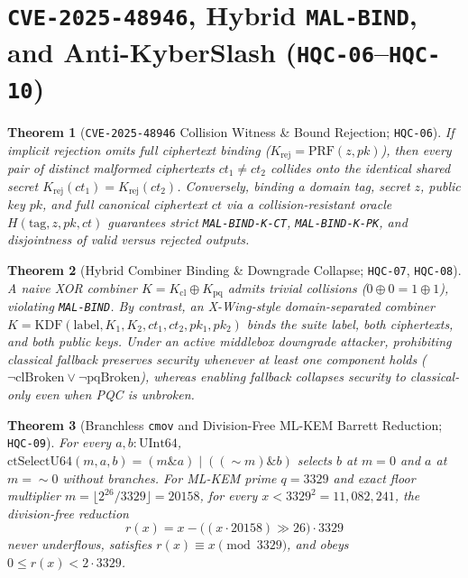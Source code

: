 \documentclass[11pt,a4paper]{article}
\theoremstyle{plain}
\newtheorem{theorem}{Theorem}[section]
\theoremstyle{remark}
\newcommand{\code}[1]{\texttt{\small #1}}
\begin{document}
\section{\code{CVE-2025-48946}, Hybrid \code{MAL-BIND}, and Anti-KyberSlash (\code{HQC-06}--\code{HQC-10})}
\label{sec:protocol-ct}

\begin{theorem}[\code{CVE-2025-48946} Collision Witness \& Bound Rejection; \code{HQC-06}]
If implicit rejection omits full ciphertext binding ($K_{\mathrm{rej}} = \mathrm{PRF}(z, pk)$), then every pair of distinct malformed ciphertexts $ct_1 \neq ct_2$ collides onto the identical shared secret $K_{\mathrm{rej}}(ct_1) = K_{\mathrm{rej}}(ct_2)$. Conversely, binding a domain tag, secret $z$, public key $pk$, and full canonical ciphertext $ct$ via a collision-resistant oracle $H(\mathrm{tag}, z, pk, ct)$ guarantees strict \code{MAL-BIND-K-CT}, \code{MAL-BIND-K-PK}, and disjointness of valid versus rejected outputs.
\end{theorem}

\begin{theorem}[Hybrid Combiner Binding \& Downgrade Collapse; \code{HQC-07}, \code{HQC-08}]
A naive XOR combiner $K = K_{\mathrm{cl}} \oplus K_{\mathrm{pq}}$ admits trivial collisions ($0\oplus 0 = 1\oplus 1$), violating \code{MAL-BIND}. By contrast, an X-Wing-style domain-separated combiner $K = \mathrm{KDF}(\mathrm{label}, K_1, K_2, ct_1, ct_2, pk_1, pk_2)$ binds the suite label, both ciphertexts, and both public keys. Under an active middlebox downgrade attacker, prohibiting classical fallback preserves security whenever at least one component holds ($\neg\mathrm{clBroken} \vee \neg\mathrm{pqBroken}$), whereas enabling fallback collapses security to classical-only even when PQC is unbroken.
\end{theorem}

\begin{theorem}[Branchless \code{cmov} and Division-Free ML-KEM Barrett Reduction; \code{HQC-09}]
For every $a,b : \mathrm{UInt64}$, $\mathrm{ctSelectU64}(m,a,b) = (m \mathbin{\&} a) \mid ((\sim m) \mathbin{\&} b)$ selects $b$ at $m=0$ and $a$ at $m=\sim 0$ without branches. For ML-KEM prime $q = 3329$ and exact floor multiplier $m = \lfloor 2^{26}/3329 \rfloor = 20158$, for every $x < 3329^2 = 11{,}082{,}241$, the division-free reduction
\begin{equation}
  r(x) = x - \bigl((x \cdot 20158) \gg 26\bigr)\cdot 3329
\end{equation}
never underflows, satisfies $r(x) \equiv x \pmod{3329}$, and obeys $0 \le r(x) < 2\cdot 3329$.
\end{theorem}
\end{document}
